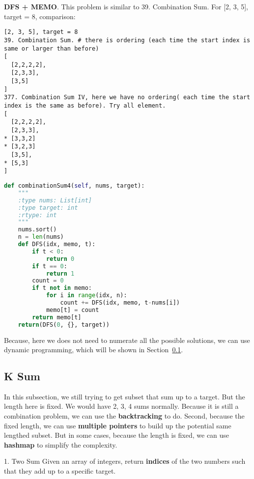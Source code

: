 \documentclass[../main.tex]{subfiles}
\begin{document}
\textbf{DFS + MEMO}. This problem is similar to 39. Combination Sum. For [2, 3, 5], target = 8,  comparison:
\begin{lstlisting}
[2, 3, 5], target = 8
39. Combination Sum. # there is ordering (each time the start index is same or larger than before)
[
  [2,2,2,2],
  [2,3,3],
  [3,5]
]
377. Combination Sum IV, here we have no ordering( each time the start index is the same as before). Try all element.
[
  [2,2,2,2],
  [2,3,3],
* [3,3,2]
* [3,2,3]
  [3,5],
* [5,3]
]
\end{lstlisting}
\begin{lstlisting}[language=Python]
def combinationSum4(self, nums, target):
    """
    :type nums: List[int]
    :type target: int
    :rtype: int
    """
    nums.sort()
    n = len(nums)
    def DFS(idx, memo, t):
        if t < 0:
            return 0
        if t == 0:
            return 1
        count = 0
        if t not in memo:
            for i in range(idx, n):
                count += DFS(idx, memo, t-nums[i])
            memo[t] = count
        return memo[t]
    return(DFS(0, {}, target))
\end{lstlisting}
Because, here we does not need to numerate all the possible solutions, we can use dynamic programming, which will be shown in Section~\ref{}. 

\subsection{K Sum}
In this subsection, we still trying to get subset that sum up to a target. But the length here is fixed. We would have 2, 3, 4 sums normally. Because it is still a combination problem, we can use the \textbf{backtracking} to do. Second, because the fixed length, we can use \textbf{multiple pointers} to build up the potential same lengthed subset.  But in some cases, because the length is fixed, we can use \textbf{hashmap} to simplify the complexity. 

1. Two Sum
Given an array of integers, return \textbf{indices} of the two numbers such that they add up to a specific target.
\end{document}
